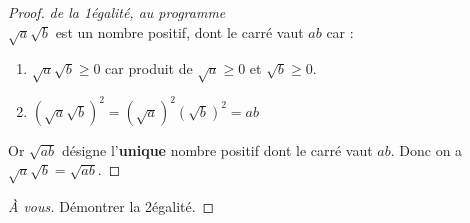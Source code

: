 \documentclass[main.tex]{subfiles}
\begin{document}
			\begin{proof} \emph{de la 1\iere égalité, au programme}\hfill \\
			$\sqrt{a}\sqrt{b}$ est un nombre positif, dont le carré vaut $ab$ car : 
				\begin{enumerate}[label=\textbullet]
					\item $\sqrt{a}\sqrt{b}\geqslant 0$ car produit de $\sqrt{a}\geqslant 0$ et $\sqrt{b}\geqslant 0$.
					\item  $(\sqrt{a}\sqrt{b})^2=(\sqrt{a})^2(\sqrt{b})^2 = ab$
				\end{enumerate} 
				Or $\sqrt{ab}$ désigne l'\textbf{unique} nombre positif dont le carré vaut $ab$.
				Donc on a $\sqrt{a}\sqrt{b} = \sqrt{ab}$. 
			\end{proof}
			\begin{proof}[À vous] Démontrer la 2\ieme égalité.
			\end{proof}
			


\newpage 
{}  
\pagestyle{scrheadings} %
\onehalfspacing
\end{document}
